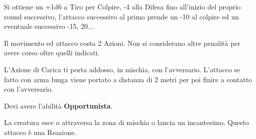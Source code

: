 \documentclass[landscape,10pt,a4paper]{article}
\begin{document}
\begin{multicols}{3}
\begin{dmbox}[title=Carica - pagina \pageref{carica}]
Si ottiene un +1d6 a Tiro per Colpire, -4 alla Difesa fino all'inizio del proprio round successivo, l'attacco successivo al primo prende un -10 al colpire ed un eventuale successivo -15, 20...

Il movimento ed attacco costa 2 Azioni. Non si considerano altre penalità per avere corso oltre quelli indicati.

L'Azione di Carica ti porta addosso, in mischia, con l'avversario. L'attacco se fatto con arma lunga viene portato a distanza di 2 metri per poi finire a contatto con l'avversario.
\end{dmbox}

\begin{dmbox}[title=Attacco di Opportunita' - pagina \pageref{attaccoopportunita}]
Devi avere l'abilità \textbf{Opportunista}.

La creatura esce o attraversa la zona di mischia o lancia un incantesimo. Questo attacco è una Reazione.
\end{dmbox}

\begin{dmbox}[title=Azioni per Round - pagina \pageref{azioninelround}]


\end{dmbox}
\end{multicols}
\end{document}
